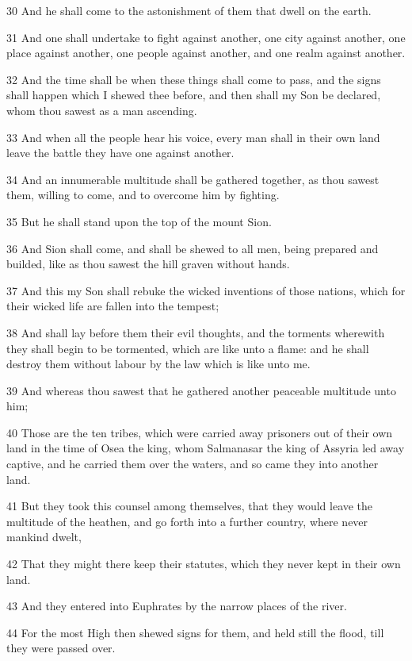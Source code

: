 \par 30 And he shall come to the astonishment of them that dwell on the earth.
\par 31 And one shall undertake to fight against another, one city against another, one place against another, one people against another, and one realm against another.
\par 32 And the time shall be when these things shall come to pass, and the signs shall happen which I shewed thee before, and then shall my Son be declared, whom thou sawest as a man ascending.
\par 33 And when all the people hear his voice, every man shall in their own land leave the battle they have one against another.
\par 34 And an innumerable multitude shall be gathered together, as thou sawest them, willing to come, and to overcome him by fighting.
\par 35 But he shall stand upon the top of the mount Sion.
\par 36 And Sion shall come, and shall be shewed to all men, being prepared and builded, like as thou sawest the hill graven without hands.
\par 37 And this my Son shall rebuke the wicked inventions of those nations, which for their wicked life are fallen into the tempest;
\par 38 And shall lay before them their evil thoughts, and the torments wherewith they shall begin to be tormented, which are like unto a flame: and he shall destroy them without labour by the law which is like unto me.
\par 39 And whereas thou sawest that he gathered another peaceable multitude unto him;
\par 40 Those are the ten tribes, which were carried away prisoners out of their own land in the time of Osea the king, whom Salmanasar the king of Assyria led away captive, and he carried them over the waters, and so came they into another land.
\par 41 But they took this counsel among themselves, that they would leave the multitude of the heathen, and go forth into a further country, where never mankind dwelt,
\par 42 That they might there keep their statutes, which they never kept in their own land.
\par 43 And they entered into Euphrates by the narrow places of the river.
\par 44 For the most High then shewed signs for them, and held still the flood, till they were passed over.
